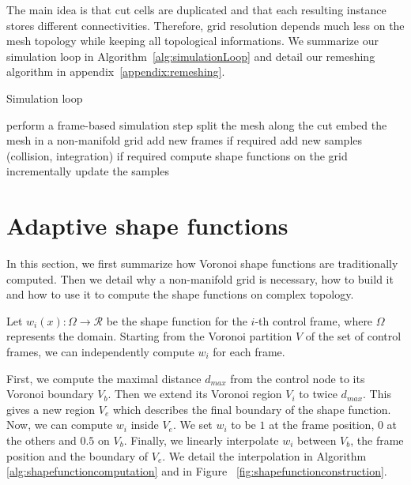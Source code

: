 The main idea is that cut cells are duplicated and that each resulting instance stores different connectivities. 
Therefore, grid resolution depends much less on the mesh topology while keeping all topological informations.
We summarize our simulation loop in Algorithm~\ref{alg:simulationLoop} and detail our remeshing algorithm in appendix~\ref{appendix:remeshing}.

\begin{algorithm}[!h]
\caption[Frame-based cutting: Simulation loop]{\label{alg:simulationLoop}Simulation loop}
\begin{algorithmic}[0]
	\State perform a frame-based simulation step
	\State split the mesh along the cut
	\State embed the mesh in a non-manifold grid
	\State add new frames if required
	\State add new samples (collision, integration) if required
	\State compute shape functions on the grid
	\State incrementally update the samples
\EndFor
\end{algorithmic}
\end{algorithm}

\newpage

\section{Adaptive shape functions} \label{sec:adaptivesf}

In this section, we first summarize how Voronoi shape functions are traditionally computed. 
Then we detail why a non-manifold grid is necessary, how to build it and how to use it to compute the shape functions on complex topology.

Let $w_{i}(x) : \Omega \rightarrow \mathcal{R}$ be the shape function for the $i$-th control frame, where $\Omega$ represents the domain. Starting from the Voronoi partition $V$ of the set of control frames, we can independently compute $w_{i}$ for each frame.

First, we compute the maximal distance $d_{max}$ from the control node to its Voronoi boundary $V_{b}$. Then we extend its Voronoi region $V_{i}$ to twice $d_{max}$. This gives a new region $V_{e}$ which describes the final boundary of the shape function. Now, we can compute $w_{i}$ inside $V_{e}$. We set $w_{i}$ to be $1$ at the frame position, $0$ at the others and $0.5$ on $V_{b}$. Finally, we linearly interpolate $w_{i}$ between $V_{b}$, the frame position and the boundary of $V_{e}$. We detail the interpolation in Algorithm~ \ref{alg:shapefunctioncomputation} and in Figure~ \ref{fig:shapefunctionconstruction}.

